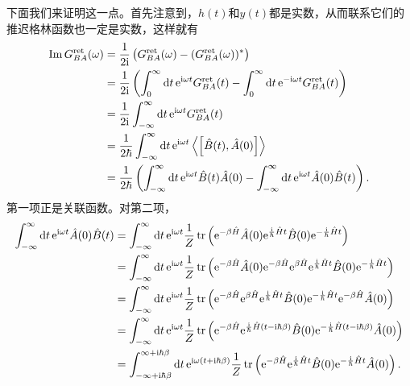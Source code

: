 \documentclass[hyperref, UTF8, a4paper]{ctexart}
\newcommand*{\ii}{\mathrm{i}}
\newcommand*{\ee}{\mathrm{e}}
\begin{document}
下面我们来证明这一点。首先注意到，$h(t)$和$y(t)$都是实数，从而联系它们的推迟格林函数也一定是实数，这样就有
\[
    \begin{aligned}
        \Im G_{BA}^\text{ret}(\omega) &= \frac{1}{2\ii} \left( G_{BA}^\text{ret}(\omega) -( G_{BA}^\text{ret}(\omega))^* \right) \\
        &= \frac{1}{2\ii} \left( \int_0^\infty \dd{t} \ee^{\ii \omega t} G_{BA}^\text{ret}(t) -\int_0^\infty \dd{t} \ee^{- \ii \omega t} G_{BA}^\text{ret}(t) \right) \\
        &= \frac{1}{2\ii} \int_{-\infty}^\infty \dd{t} \ee^{\ii \omega t} G_{BA}^\text{ret}(t) \\
        &= \frac{1}{2\hbar} \int_{-\infty}^\infty \dd{t} \ee^{\ii \omega t} \expval{\comm{\hat{B}(t)}{\hat{A}(0)}} \\
        &= \frac{1}{2\hbar} \left( \int_{-\infty}^\infty \dd{t} \ee^{\ii \omega t} \hat{B}(t) \hat{A}(0) - \int_{-\infty}^\infty \dd{t} \ee^{\ii \omega t} \hat{A}(0) \hat{B}(t) \right).
    \end{aligned}
\]
第一项正是关联函数。对第二项，
\[
    \begin{aligned}
        \int_{-\infty}^\infty \dd{t} \ee^{\ii \omega t} \hat{A}(0) \hat{B}(t) &= \int_{-\infty}^\infty \dd{t} \ee^{\ii \omega t} \frac{1}{Z} \trace \left( \ee^{-\beta \hat{H}} \hat{A}(0) \ee^{\frac{\ii}{\hbar} \hat{H} t} \hat{B}(0) \ee^{ - \frac{\ii}{\hbar} \hat{H} t} \right) \\
        &= \int_{-\infty}^\infty \dd{t} \ee^{\ii \omega t} \frac{1}{Z} \trace \left( \ee^{-\beta\hat{H}} \hat{A}(0) \ee^{-\beta \hat{H}} \ee^{\beta \hat{H}} \ee^{\frac{\ii}{\hbar} \hat{H} t} \hat{B}(0) \ee^{ - \frac{\ii}{\hbar} \hat{H} t} \right) \\
        &= \int_{-\infty}^\infty \dd{t} \ee^{\ii \omega t} \frac{1}{Z} \trace \left( \ee^{-\beta \hat{H}} \ee^{\beta \hat{H}} \ee^{\frac{\ii}{\hbar} \hat{H} t} \hat{B}(0) \ee^{ - \frac{\ii}{\hbar} \hat{H} t} \ee^{-\beta\hat{H}} \hat{A}(0) \right) \\
        &= \int_{-\infty}^\infty \dd{t} \ee^{\ii \omega t} \frac{1}{Z} \trace \left( \ee^{-\beta \hat{H}} \ee^{\frac{\ii}{\hbar} \hat{H} (t - \ii \hbar \beta)} \hat{B}(0) \ee^{ - \frac{\ii}{\hbar} \hat{H} (t - \ii \hbar \beta)} \hat{A}(0) \right) \\
        &= \int_{-\infty+\ii\hbar\beta}^{\infty+\ii\hbar\beta} \dd{t} \ee^{\ii \omega (t + \ii \hbar \beta)} \frac{1}{Z} \trace \left( \ee^{-\beta \hat{H}} \ee^{\frac{\ii}{\hbar} \hat{H} t} \hat{B}(0) \ee^{ - \frac{\ii}{\hbar} \hat{H} t} \hat{A}(0) \right).
    \end{aligned}
\]
\end{document}
